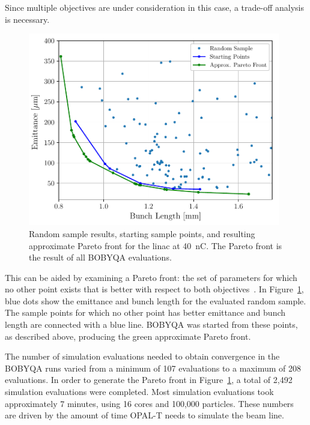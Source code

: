 Since multiple objectives are under consideration in this case, a
trade-off analysis is necessary. 
\begin{figure}[h]
	\captionsetup{width=0.98\linewidth}
	\begin{center}
		\includegraphics[width=0.98\textwidth]{images/THPAB155f1}
		\caption{Random sample results, starting sample points, and resulting approximate Pareto front for the linac at \SI{40}{nC}. The Pareto front is the result of all BOBYQA evaluations.}
		\label{fig:pareto}
	\end{center}
\end{figure}
This can be aided by examining a Pareto front: the set of parameters 
for which no other point exists that is better with respect to both objectives~\cite{ehrgott2006multicriteria}.
In Figure~\ref{fig:pareto}, blue dots show the emittance and bunch length for the
evaluated random sample. The sample points for which no other point has better
emittance and bunch length are connected with a blue line. BOBYQA was started
from these points, as described above, producing the green approximate Pareto front. 


The number of simulation evaluations needed to obtain convergence
in the BOBYQA runs varied from a minimum of 107 evaluations to a maximum of 208 
evaluations. In order to generate the Pareto front in
Figure~\ref{fig:pareto}, a total of 2,492 simulation evaluations were completed.
Most simulation evaluations took approximately 7 minutes, using 16 cores and 100,000 particles. These numbers are driven by the amount of time OPAL-T needs to simulate the beam line. 


